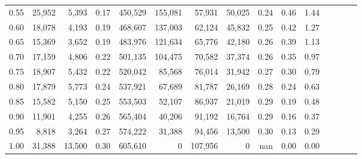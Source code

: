\begin{tabular}{rrrcrrrrrrrrrrr}
0.55 &  25,952 &   5,393 &                                       0.17 &  450,529 &  155,081 &   57,931 &   50,025 &  0.24 &  0.46 &                         1.44 \\
0.60 &  18,078 &   4,193 &                                       0.19 &  468,607 &  137,003 &   62,124 &   45,832 &  0.25 &  0.42 &                         1.27 \\
0.65 &  15,369 &   3,652 &                                       0.19 &  483,976 &  121,634 &   65,776 &   42,180 &  0.26 &  0.39 &                         1.13 \\
0.70 &  17,159 &   4,806 &                                       0.22 &  501,135 &  104,475 &   70,582 &   37,374 &  0.26 &  0.35 &                         0.97 \\
0.75 &  18,907 &   5,432 &                                       0.22 &  520,042 &   85,568 &   76,014 &   31,942 &  0.27 &  0.30 &                         0.79 \\
0.80 &  17,879 &   5,773 &                                       0.24 &  537,921 &   67,689 &   81,787 &   26,169 &  0.28 &  0.24 &                         0.63 \\
0.85 &  15,582 &   5,150 &                                       0.25 &  553,503 &   52,107 &   86,937 &   21,019 &  0.29 &  0.19 &                         0.48 \\
0.90 &  11,901 &   4,255 &                                       0.26 &  565,404 &   40,206 &   91,192 &   16,764 &  0.29 &  0.16 &                         0.37 \\
0.95 &   8,818 &   3,264 &                                       0.27 &  574,222 &   31,388 &   94,456 &   13,500 &  0.30 &  0.13 &                         0.29 \\
1.00 &  31,388 &  13,500 &                                       0.30 &  605,610 &        0 &  107,956 &        0 &   nan &  0.00 &                         0.00 \\
\bottomrule
\end{tabular}
